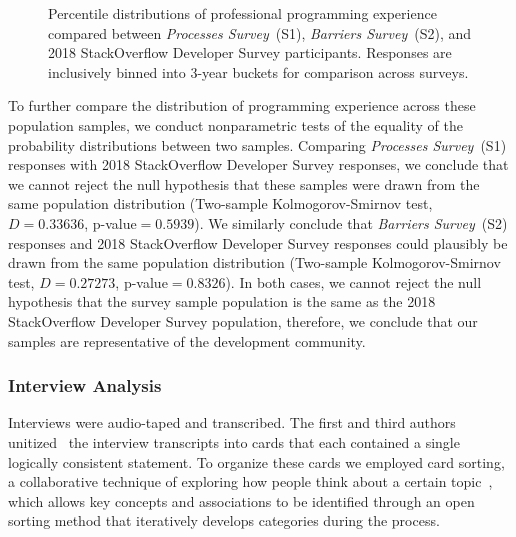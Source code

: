 \begin{figure}[!htbp]
\centering
{}
\caption{Percentile distributions of professional programming experience compared between \textit{Processes Survey}~(S1), \textit{Barriers Survey}~(S2), and 2018 StackOverflow Developer Survey participants. Responses are inclusively binned into 3-year buckets for comparison across surveys.\vspace*{-0.3\baselineskip}}
\label{populations}
\end{figure}

To further compare the distribution of programming experience across these population samples, we conduct nonparametric tests of the equality of the probability distributions between two samples.
Comparing \textit{Processes Survey}~(S1) responses with 2018 StackOverflow Developer Survey responses, we conclude that we cannot reject the null hypothesis that these samples were drawn from the same population distribution (Two-sample Kolmogorov-Smirnov test, $D = 0.33636$, p-value$ = 0.5939$).
We similarly conclude that \textit{Barriers Survey}~(S2) responses and 2018 StackOverflow Developer Survey responses could plausibly be drawn from the same population distribution (Two-sample Kolmogorov-Smirnov test, $D = 0.27273$, p-value$ = 0.8326$).
In both cases, we cannot reject the null hypothesis that the survey sample population is the same as the 2018 StackOverflow Developer Survey population, therefore, we conclude that our samples are representative of the development community.

\subsubsection{Interview Analysis}

Interviews were audio-taped and transcribed. 
The first and third authors unitized~\cite{unitization} the interview transcripts into cards that each contained a single logically consistent statement. 
To organize these cards we employed card sorting, a collaborative technique of exploring how people think about a certain topic~\cite{spencer2009card,card_sort}, which allows key concepts and associations to be identified through an open sorting method that iteratively develops categories during the process.

